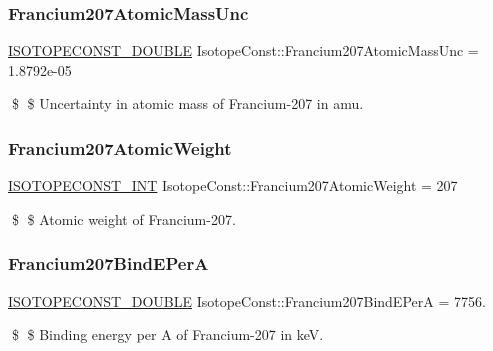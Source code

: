 \subsubsection{\texorpdfstring{Francium207\+Atomic\+Mass\+Unc}{Francium207AtomicMassUnc}}
{\footnotesize\ttfamily \mbox{\hyperlink{group___isotope_const-_macros_ga8f45a7272ce02c0b4c65c44636ed719a}{I\+S\+O\+T\+O\+P\+E\+C\+O\+N\+S\+T\+\_\+\+D\+O\+U\+B\+LE}} Isotope\+Const\+::\+Francium207\+Atomic\+Mass\+Unc = 1.\+8792e-\/05}

\$ \$ Uncertainty in atomic mass of Francium-\/207 in amu. \mbox{\label{group___isotope_const-_francium-_fr207_ga022393e65010da241bc395404fd5478c}} 
\subsubsection{\texorpdfstring{Francium207\+Atomic\+Weight}{Francium207AtomicWeight}}
{\footnotesize\ttfamily \mbox{\hyperlink{group___isotope_const-_macros_ga5f18360b3e99483a35c32d789e62621c}{I\+S\+O\+T\+O\+P\+E\+C\+O\+N\+S\+T\+\_\+\+I\+NT}} Isotope\+Const\+::\+Francium207\+Atomic\+Weight = 207}

\$ \$ Atomic weight of Francium-\/207. \mbox{\label{group___isotope_const-_francium-_fr207_gaac69a9874039600371e1c3a16d88b7cb}} 
\subsubsection{\texorpdfstring{Francium207\+Bind\+E\+PerA}{Francium207BindEPerA}}
{\footnotesize\ttfamily \mbox{\hyperlink{group___isotope_const-_macros_ga8f45a7272ce02c0b4c65c44636ed719a}{I\+S\+O\+T\+O\+P\+E\+C\+O\+N\+S\+T\+\_\+\+D\+O\+U\+B\+LE}} Isotope\+Const\+::\+Francium207\+Bind\+E\+PerA = 7756.}

\$ \$ Binding energy per A of Francium-\/207 in keV. \mbox{\label{group___isotope_const-_francium-_fr207_ga547de746839b4444f9ba3fcc180d6889}} 

